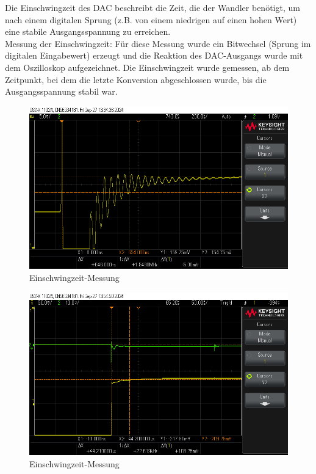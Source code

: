 \documentclass[a4paper,12pt]{article}
\begin{document}
Die Einschwingzeit des DAC beschreibt die Zeit, die der Wandler benötigt, um nach einem digitalen Sprung (z.B. von einem niedrigen auf einen hohen Wert) eine stabile Ausgangsspannung zu erreichen.\\
\noindent Messung der Einschwingzeit: Für diese Messung wurde ein Bitwechsel (Sprung im digitalen Eingabewert) erzeugt und die Reaktion des DAC-Ausgangs wurde mit dem Oszilloskop aufgezeichnet. Die Einschwingzeit wurde gemessen, ab dem Zeitpunkt, bei dem die letzte Konversion abgeschlossen wurde, bis die Ausgangsspannung stabil war.

\begin{figure}[H]
    \centering
    \includegraphics[width=1\textwidth]{../Quellen/Labor1/Versuch2/scope_3.png}
    \caption{Einschwingzeit-Messung}
\end{figure}

\begin{figure}[H]
    \centering
    \includegraphics[width=1\textwidth]{../Quellen/Labor1/Versuch2/scope_5.png}
    \caption{Einschwingzeit-Messung}
\end{figure}
\end{document}
